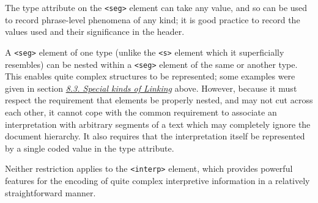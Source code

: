 \documentclass[11pt,twoside]{article}\makeatletter
\begin{document}
The type attribute on the \texttt{<seg>} element
can take any value, and so can be used to record phrase-level
phenomena of any kind; it is good practice to record the values used
and their significance in the header.\par A \texttt{<seg>} element of one type (unlike the \texttt{<s>}
element which it superficially resembles) can be nested within a \texttt{<seg>}
element of the same or another type. This enables quite complex
structures to be represented; some examples were given in section
\textit{\hyperref[xatts]{8.3. Special kinds of Linking}} above. However, because it must respect the
requirement that elements be properly nested, and may not cut
across each other, it cannot cope with the common requirement to
associate an interpretation with arbitrary segments of a text which
may completely ignore the document hierarchy. It also requires that
the interpretation itself be represented by a single coded value in
the type attribute.\par Neither restriction applies to the \texttt{<interp>} element, which
provides powerful features for the encoding of quite complex
interpretive information in a relatively straightforward manner.
\end{document}
